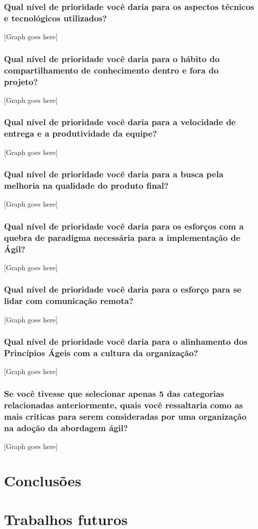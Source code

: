 \subsubsection{Qual nível de prioridade você daria para os aspectos técnicos e tecnológicos utilizados?}

[Graph goes here]

\subsubsection{Qual nível de prioridade você daria para o hábito do compartilhamento de conhecimento dentro e fora do projeto?}

[Graph goes here]

\subsubsection{Qual nível de prioridade você daria para a velocidade de entrega e a produtividade da equipe?}

[Graph goes here]

\subsubsection{Qual nível de prioridade você daria para a busca pela melhoria na qualidade do produto final?}

[Graph goes here]

\subsubsection{Qual nível de prioridade você daria para os esforços com a quebra de paradigma necessária para a implementação de Ágil?}

[Graph goes here]

\subsubsection{Qual nível de prioridade você daria para o esforço para se lidar com comunicação remota?}

[Graph goes here]

\subsubsection{Qual nível de prioridade você daria para o alinhamento dos Princípios Ágeis com a cultura da organização?}

[Graph goes here]

\subsubsection{Se você tivesse que selecionar apenas 5 das categorias relacionadas anteriormente, quais você ressaltaria como as mais críticas para serem consideradas por uma organização na adoção da abordagem ágil?}

[Graph goes here]

\section{Conclusões}


\section{Trabalhos futuros}
